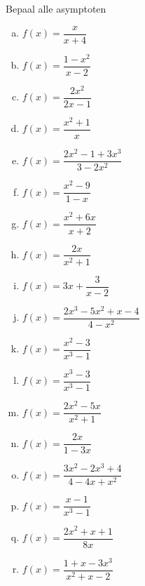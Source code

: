 \documentclass[12pt]{article}
\begin{document}
\begin{oefening} %
Bepaal alle asymptoten\\
\begin{multicols}{3}
\begin{enumerate}[(a)]
  \itemsep1em
  \item $\displaystyle f(x)=\dfrac{x}{x+4}$
  \item $\displaystyle f(x)=\dfrac{1-x^2}{x-2}$
  \item $\displaystyle f(x)=\dfrac{2x^2}{2x-1}$
  \item $\displaystyle f(x)=\dfrac{x^2+1}{x}$
  \item $\displaystyle f(x)=\dfrac{2x^2-1+3x^3}{3-2x^2}$
  \item $\displaystyle f(x)=\dfrac{x^2-9}{1-x}$
  \item $\displaystyle f(x)=\dfrac{x^2+6x}{x+2}$
  \item $\displaystyle f(x)=\dfrac{2x}{x^2+1}$
  \item $\displaystyle f(x)=3x+\dfrac{3}{x-2}$
  \item $\displaystyle f(x)=\dfrac{2x^3-5x^2+x-4}{4-x^2}$
  \item $\displaystyle f(x)=\dfrac{x^2-3}{x^3-1}$
  \item $\displaystyle f(x)=\dfrac{x^3-3}{x^3-1}$
  \item $\displaystyle f(x)=\dfrac{2x^2-5x}{x^2+1}$
  \item $\displaystyle f(x)=\dfrac{2x}{1-3x}$
  \item $\displaystyle f(x)=\dfrac{3x^2-2x^3+4}{4-4x+x^2}$
  \item $\displaystyle f(x)=\dfrac{x-1}{x^3-1}$
  \item $\displaystyle f(x)=\dfrac{2x^2+x+1}{8x}$
  \item $\displaystyle f(x)=\dfrac{1+x-3x^3}{x^2+x-2}$
\end{enumerate}
\end{multicols}
\end{oefening}


\end{document}
